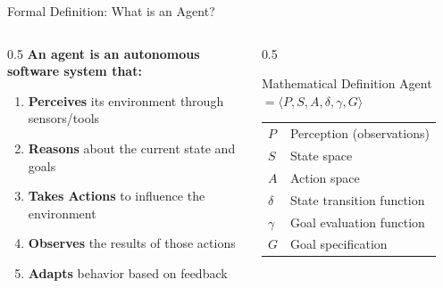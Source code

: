 \documentclass[aspectratio=169, 11pt]{beamer}
\begin{document}
\begin{frame}{Formal Definition: What is an Agent?}
    \begin{columns}[T]
        \begin{column}{0.5\textwidth}
            \textbf{An agent is an autonomous software system that:}
            \begin{enumerate}
                \item \textbf{Perceives} its environment through sensors/tools
                \item \textbf{Reasons} about the current state and goals
                \item \textbf{Takes Actions} to influence the environment
                \item \textbf{Observes} the results of those actions
                \item \textbf{Adapts} behavior based on feedback
            \end{enumerate}
        \end{column}
        \begin{column}{0.5\textwidth}
            \begin{block}{Mathematical Definition}
                \centering
                Agent $= \langle P, S, A, \delta, \gamma, G \rangle$
                \vspace{0.3cm}
                \begin{tabular}{ll}
                    $P$ & Perception (observations) \\
                    $S$ & State space \\
                    $A$ & Action space \\
                    $\delta$ & State transition function \\
                    $\gamma$ & Goal evaluation function \\
                    $G$ & Goal specification \\
                \end{tabular}
            \end{block}
        \end{column}
    \end{columns}

\end{frame}
\end{document}
